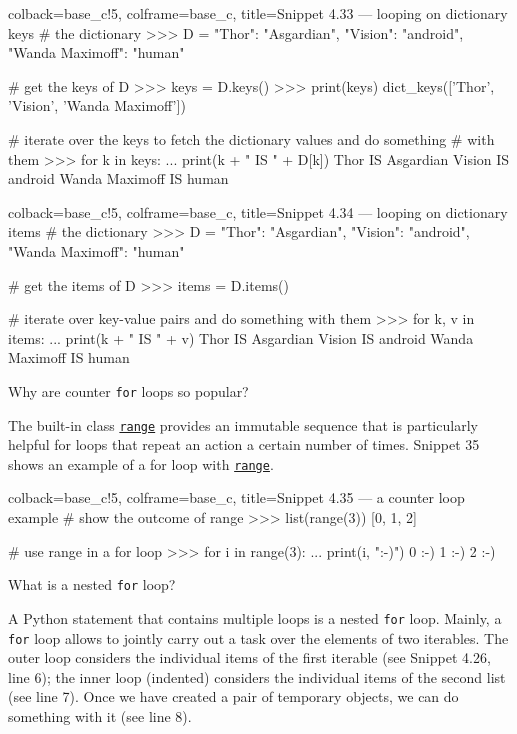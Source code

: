 \documentclass[a4paper,11pt]{book}
\newcommand{\question}[1]{%
    \begin{tcolorbox}[colback=comp_c!10,colframe=comp_c,sidebyside align=top,width=\linewidth,before skip=1ex]
        #1
    \end{tcolorbox}
    \switchcolumn%
}
\newcommand{\note}[1]{%
    \begin{tcolorbox}[colback=white!0,colframe=white!10,width=\linewidth,before skip=1ex]
        #1
    \end{tcolorbox}
}
\begin{document}
\begin{pythoncode}[linenos=true,]{colback=base_c!5, colframe=base_c, title=\sffamily Snippet 4.33 --- looping on dictionary keys}
# the dictionary
>>> D = {"Thor": "Asgardian", "Vision": "android", "Wanda Maximoff": "human"}

# get the keys of D
>>> keys = D.keys()
>>> print(keys)
dict_keys(['Thor', 'Vision', 'Wanda Maximoff'])

# iterate over the keys to fetch the dictionary values and do something 
# with them
>>> for k in keys:
...     print(k + " IS " + D[k])
Thor IS Asgardian
Vision IS android
Wanda Maximoff IS human
\end{pythoncode}

\begin{pythoncode}[linenos=true,]{colback=base_c!5, colframe=base_c, title=\sffamily Snippet 4.34 --- looping on dictionary items}
# the dictionary
>>> D = {"Thor": "Asgardian", "Vision": "android", "Wanda Maximoff": "human"}

# get the items of D
>>> items = D.items()

# iterate over key-value pairs and do something with them
>>> for k, v in items:
...    print(k + " IS " + v)
Thor IS Asgardian
Vision IS android
Wanda Maximoff IS human
\end{pythoncode}
\clearpage

\begin{paracol}{2}
	\question{\raggedright Why are counter \texttt{for} loops so popular?}
	\note{The built-in class \href{https://docs.python.org/3/library/functions.html\#func-range}{\texttt{range}} provides an immutable sequence that is particularly helpful for loops that repeat an action a certain number of times. Snippet 35 shows an example of a for loop with \href{https://docs.python.org/3/library/functions.html\#func-range}{\texttt{range}}.}
\end{paracol}

\begin{pythoncode}[linenos=true,]{colback=base_c!5, colframe=base_c, title=\sffamily Snippet 4.35 --- a counter loop example}
# show the outcome of range
>>> list(range(3))
[0, 1, 2]

# use range in a for loop
>>> for i in range(3):
...     print(i, ":-)")
0 :-)
1 :-)
2 :-)
\end{pythoncode}

\begin{paracol}{2}
	\question{\raggedright What is a nested \texttt{for} loop?}
    \note{A Python statement that contains multiple  loops is a nested \texttt{for} loop. Mainly, a
    \texttt{for} loop allows to jointly carry out a task over the elements of two iterables. The outer loop considers the individual items of the first iterable (see Snippet 4.26, line 6); the inner loop (indented) considers the individual items of the second list (see line 7). Once we have created a pair of temporary objects, we can do something with it (see line 8).}
\end{paracol}
\end{document}

